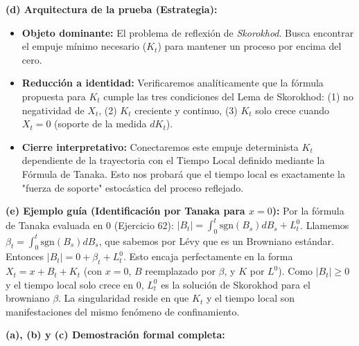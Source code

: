 \documentclass[11pt, letterpaper]{article}
\begin{document}
\vspace{5mm}

\begin{solucion}
    \textbf{(d) Arquitectura de la prueba (Estrategia):}
    \begin{itemize}
        \item[(i)] \textbf{Objeto dominante:} El problema de reflexión de \textit{Skorokhod}. Busca encontrar el empuje mínimo necesario ($K_t$) para mantener un proceso por encima del cero.
        \item[(ii)] \textbf{Reducción a identidad:} Verificaremos analíticamente que la fórmula propuesta para $K_t$ cumple las tres condiciones del Lema de Skorokhod: (1) no negatividad de $X_t$, (2) $K_t$ creciente y continuo, (3) $K_t$ solo crece cuando $X_t = 0$ (soporte de la medida $dK_t$).
        \item[(iii)] \textbf{Cierre interpretativo:} Conectaremos este empuje determinista $K_t$ dependiente de la trayectoria con el Tiempo Local definido mediante la Fórmula de Tanaka. Esto nos probará que el tiempo local es exactamente la "fuerza de soporte" estocástica del proceso reflejado.
    \end{itemize}

    \vspace{3mm}
    \textbf{(e) Ejemplo guía (Identificación por Tanaka para $x=0$):}
    Por la fórmula de Tanaka evaluada en 0 (Ejercicio 62):
    $|B_t| = \int_0^t \text{sgn}(B_s) dB_s + L_t^0$.
    Llamemos $\beta_t = \int_0^t \text{sgn}(B_s) dB_s$, que sabemos por Lévy que es un Browniano estándar.
    Entonces $|B_t| = 0 + \beta_t + L_t^0$.
    Esto encaja perfectamente en la forma $X_t = x + B_t + K_t$ (con $x=0$, $B$ reemplazado por $\beta$, y $K$ por $L^0$). Como $|B_t| \ge 0$ y el tiempo local solo crece en 0, $L_t^0$ es la solución de Skorokhod para el browniano $\beta$. La singularidad reside en que $K_t$ y el tiempo local son manifestaciones del mismo fenómeno de confinamiento.

    \textbf{(a), (b) y (c) Demostración formal completa:}


\end{solucion}
\end{document}
